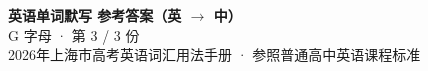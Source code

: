 \documentclass[10pt,a4paper]{article}
\begin{document}
\pagestyle{plain}

\begin{center}
{\LARGE\bfseries 英语单词默写 \quad 参考答案（英 $\to$ 中）}\\[0.22em]
{\large G 字母 · 第 3 / 3 份}\\[0.18em]
{\small 2026年上海市高考英语词汇用法手册 · 参照普通高中英语课程标准}
\end{center}

\vspace{0.2em}
\noindent{\color{rulegray}\rule{\textwidth}{0.8pt}}

\vspace{0.35em}

\vspace{0.25em}
\renewcommand{\arraystretch}{1.32}
\end{document}
